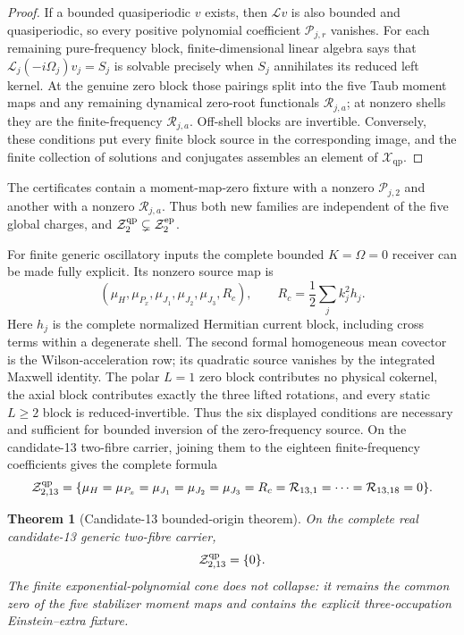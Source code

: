 \documentclass[11pt]{article}
\newtheorem{theorem}{Theorem}[section]
\theoremstyle{definition}
\theoremstyle{remark}
\newcommand{\cL}{\mathcal L}
\newcommand{\cZ}{\mathcal Z}
\newcommand{\cP}{\mathcal P}
\newcommand{\cR}{\mathcal R}
\newcommand{\Xqp}{\mathscr X_{\mathrm{qp}}}
\begin{document}
\begin{proof}
If a bounded quasiperiodic \(v\) exists, then \(\cL v\) is also bounded and
quasiperiodic, so every positive polynomial coefficient \(\cP_{j,r}\)
vanishes.  For each remaining pure-frequency block, finite-dimensional linear
algebra says that \(\cL_j(-i\Omega_j)v_j=S_j\) is solvable precisely when
\(S_j\) annihilates its reduced left kernel.  At the genuine zero block those
pairings split into the five Taub moment maps and any remaining dynamical
zero-root functionals \(\cR_{j,a}\); at nonzero shells they are the
finite-frequency \(\cR_{j,a}\).  Off-shell blocks are invertible.  Conversely, these
conditions put every finite block source in the corresponding image, and the
finite collection of solutions and conjugates assembles an element of
\(\Xqp\).
\end{proof}

The certificates contain a moment-map-zero fixture with a nonzero
\(\cP_{j,2}\) and another with a nonzero \(\cR_{j,a}\).  Thus both new
families are independent of the five global charges, and
\(\cZ_2^{\rm qp}\subsetneq\cZ_2^{\rm ep}\).

For finite generic oscillatory inputs the complete bounded
\(K=\Omega=0\) receiver can be made fully explicit.  Its nonzero source map is
\[
 (\mu_H,\mu_{P_x},\mu_{J_1},\mu_{J_2},\mu_{J_3},R_c),
 \qquad
 R_c=\frac12\sum_j k_j^2 h_j .
\]
Here \(h_j\) is the complete normalized Hermitian current block, including
cross terms within a degenerate shell.  The second formal homogeneous mean
covector is the Wilson-acceleration row; its quadratic source vanishes by the
integrated Maxwell identity.  The polar \(L=1\) zero block contributes no
physical cokernel, the axial block contributes exactly the three lifted
rotations, and every static \(L\ge2\) block is reduced-invertible.  Thus the
six displayed conditions are necessary and sufficient for bounded inversion
of the zero-frequency source.  On the candidate-13 two-fibre carrier, joining
them to the eighteen finite-frequency coefficients gives the complete formula
\[
 \cZ^{\rm qp}_{2,13}
 =\{\mu_H=\mu_{P_x}=\mu_{J_1}=\mu_{J_2}=\mu_{J_3}
      =R_c=\cR_{13,1}=\cdots=\cR_{13,18}=0\}.
\]
\begin{theorem}[Candidate-13 bounded-origin theorem]
On the complete real candidate-13 generic two-fibre carrier,
\[
 \cZ^{\rm qp}_{2,13}=\{0\}.
\]
The finite exponential-polynomial cone does not collapse: it remains the
common zero of the five stabilizer moment maps and contains the explicit
three-occupation Einstein--extra fixture.
\end{theorem}
\end{document}
